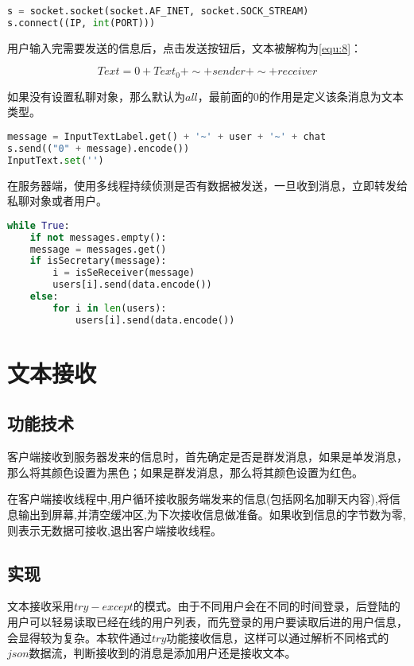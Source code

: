 \documentclass[forprint]{sql}
\begin{document}
\begin{lstlisting}[language=Python]
s = socket.socket(socket.AF_INET, socket.SOCK_STREAM)
s.connect((IP, int(PORT)))
\end{lstlisting} 

用户输入完需要发送的信息后，点击发送按钮后，文本被解构为\ref{equ:8}：

\begin{equation}
	Text = 0+Text_{0}+\sim+sender+\sim+receiver
	\label{equ:8}
\end{equation}

如果没有设置私聊对象，那么默认为$all$，最前面的0的作用是定义该条消息为文本类型。

\begin{lstlisting}[language=Python]
message = InputTextLabel.get() + '~' + user + '~' + chat
s.send(("0" + message).encode())
InputText.set('')
\end{lstlisting} 

在服务器端，使用多线程持续侦测是否有数据被发送，一旦收到消息，立即转发给私聊对象或者用户。

\begin{lstlisting}[language=Python]
while True:
	if not messages.empty():
	message = messages.get()
	if isSecretary(message):
		i = isSeReceiver(message)
		users[i].send(data.encode())
	else:
		for i in len(users):
			users[i].send(data.encode())
\end{lstlisting} 

\section{文本接收}

\subsection{功能技术}

客户端接收到服务器发来的信息时，首先确定是否是群发消息，如果是单发消息，那么将其颜色设置为黑色；如果是群发消息，那么将其颜色设置为红色。

在客户端接收线程中,用户循环接收服务端发来的信息(包括网名加聊天内容),将信息输出到屏幕,并清空缓冲区,为下次接收信息做准备。如果收到信息的字节数为零,则表示无数据可接收,退出客户端接收线程。

\subsection{实现}

文本接收采用$try-except$的模式。由于不同用户会在不同的时间登录，后登陆的用户可以轻易读取已经在线的用户列表，而先登录的用户要读取后进的用户信息，会显得较为复杂。本软件通过$try$功能接收信息，这样可以通过解析不同格式的$json$数据流，判断接收到的消息是添加用户还是接收文本。
\end{document}
